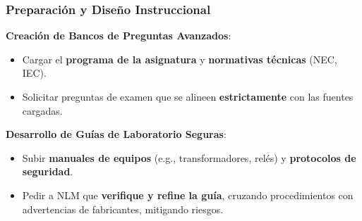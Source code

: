 \documentclass[aspectratio=43]{beamer}
\begin{document}





\begin{frame}
\frametitle{Preparación y Diseño Instruccional}

\textbf{Creación de Bancos de Preguntas Avanzados}:
\begin{itemize}
    \item Cargar el \textbf{programa de la asignatura} y \textbf{normativas técnicas} (NEC, IEC).
    \item Solicitar preguntas de examen que se alineen \textbf{estrictamente} con las fuentes cargadas.
\end{itemize}

\textbf{Desarrollo de Guías de Laboratorio Seguras}:
\begin{itemize}
    \item Subir \textbf{manuales de equipos} (e.g., transformadores, relés) y \textbf{protocolos de seguridad}.
    \item Pedir a NLM que \textbf{verifique y refine la guía}, cruzando procedimientos con advertencias de fabricantes, mitigando riesgos.
\end{itemize}
\end{frame}
\end{document}
